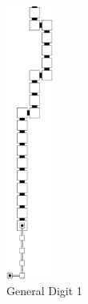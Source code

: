 \begin{itemize}
        \begin{figure}[H]
            \centering
            \begin{subfigure}[t]{0.17\textwidth}
                \centering
                \includegraphics[width=0.17\textwidth]{warping/post_warp_general_digit1}
                \caption{\label{fig:post_warp_general_digit1} General Digit 1}
            \end{subfigure}%
            ~
            \begin{subfigure}[t]{0.17\textwidth}
                \centering

\end{subfigure}
\end{figure}
\end{itemize}
